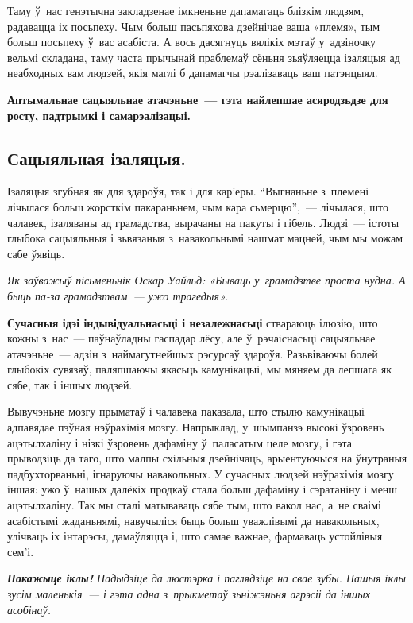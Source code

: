 Таму ў~нас генэтычна закладзенае імкненьне дапамагаць блізкім людзям, радавацца іх посьпеху. Чым больш пасьпяхова дзейнічае ваша «племя», тым больш посьпеху ў~вас асабіста. А вось дасягнуць вялікіх мэтаў у~адзіночку вельмі складана, таму часта прычынай праблемаў сёньня зьяўляецца ізаляцыя ад неабходных вам людзей, якія маглі б дапамагчы рэалізаваць ваш патэнцыял. 

\textbf{Аптымальнае сацыяльнае атачэньне~--- гэта найлепшае асяродзьдзе для росту, падтрымкі і самарэалізацыі.}

\subsection*{Сацыяльная ізаляцыя.}

Ізаляцыя згубная як для здароўя, так і для кар'еры. ``Выгнаньне з~племені лічылася больш жорсткім пакараньнем, чым кара сьмерцю'',~--- лічылася, што чалавек, ізаляваны ад грамадства, вырачаны на пакуты і гібель. Людзі~--- істоты глыбока сацыяльныя і зьвязаныя з~навакольнымі нашмат мацней, чым мы можам сабе ўявіць.

\emph{Як заўважыў пісьменьнік Оскар Уайльд: «Бываць у~грамадзтве проста нудна. А быць па-за грамадзтвам~--- ужо трагедыя».}

\textbf{Сучасныя ідэі індывідуальнасьці і незалежнасьці} ствараюць ілюзію, што кожны з~нас~--- паўнаўладны гаспадар лёсу, але ў~рэчаіснасьці сацыяльнае атачэньне~--- адзін з~наймагутнейшых рэсурсаў здароўя. Разьвіваючы болей глыбокіх сувязяў, паляпшаючы якасьць камунікацыі, мы мяняем да лепшага як сябе, так і іншых людзей.

Вывучэньне мозгу прыматаў і чалавека паказала, што стылю камунікацыі адпавядае пэўная нэўрахімія мозгу. Напрыклад, у~шымпанзэ высокі ўзровень ацэтылхаліну і нізкі ўзровень дафаміну ў~паласатым целе мозгу, і гэта прыводзіць да таго, што малпы схільныя дзейнічаць, арыентуючыся на ўнутраныя падбухторваньні, ігнаруючы навакольных. У сучасных людзей нэўрахімія мозгу іншая: ужо ў~нашых далёкіх продкаў стала больш дафаміну і сэратаніну і менш ацэтылхаліну. Так мы сталі матываваць сябе тым, што вакол нас, а~не сваімі асабістымі жаданьнямі, навучыліся быць больш уважлівымі да навакольных, улічваць іх інтарэсы, дамаўляцца і, што самае важнае, фармаваць устойлівыя сем'і.

\emph{\textbf{Пакажыце іклы!} Падыдзіце да люстэрка і паглядзіце на свае зубы. Нашыя іклы зусім маленькія~--- і гэта адна з~прыкметаў зьніжэньня агрэсіі да іншых асобінаў.}

